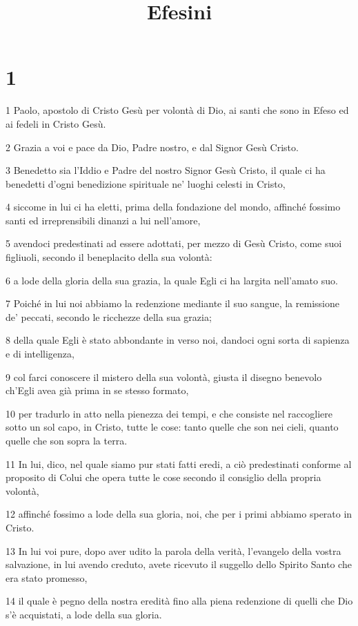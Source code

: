 

\title{Efesini}


\chapter{1}

\par 1 Paolo, apostolo di Cristo Gesù per volontà di Dio, ai santi che sono in Efeso ed ai fedeli in Cristo Gesù.
\par 2 Grazia a voi e pace da Dio, Padre nostro, e dal Signor Gesù Cristo.
\par 3 Benedetto sia l'Iddio e Padre del nostro Signor Gesù Cristo, il quale ci ha benedetti d'ogni benedizione spirituale ne' luoghi celesti in Cristo,
\par 4 siccome in lui ci ha eletti, prima della fondazione del mondo, affinché fossimo santi ed irreprensibili dinanzi a lui nell'amore,
\par 5 avendoci predestinati ad essere adottati, per mezzo di Gesù Cristo, come suoi figliuoli, secondo il beneplacito della sua volontà:
\par 6 a lode della gloria della sua grazia, la quale Egli ci ha largita nell'amato suo.
\par 7 Poiché in lui noi abbiamo la redenzione mediante il suo sangue, la remissione de' peccati, secondo le ricchezze della sua grazia;
\par 8 della quale Egli è stato abbondante in verso noi, dandoci ogni sorta di sapienza e di intelligenza,
\par 9 col farci conoscere il mistero della sua volontà, giusta il disegno benevolo ch'Egli avea già prima in se stesso formato,
\par 10 per tradurlo in atto nella pienezza dei tempi, e che consiste nel raccogliere sotto un sol capo, in Cristo, tutte le cose: tanto quelle che son nei cieli, quanto quelle che son sopra la terra.
\par 11 In lui, dico, nel quale siamo pur stati fatti eredi, a ciò predestinati conforme al proposito di Colui che opera tutte le cose secondo il consiglio della propria volontà,
\par 12 affinché fossimo a lode della sua gloria, noi, che per i primi abbiamo sperato in Cristo.
\par 13 In lui voi pure, dopo aver udito la parola della verità, l'evangelo della vostra salvazione, in lui avendo creduto, avete ricevuto il suggello dello Spirito Santo che era stato promesso,
\par 14 il quale è pegno della nostra eredità fino alla piena redenzione di quelli che Dio s'è acquistati, a lode della sua gloria.

